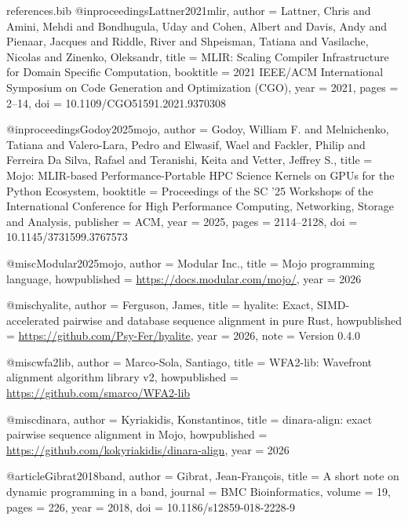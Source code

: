 \begin{filecontents*}[overwrite]{references.bib}
@inproceedings{Lattner2021mlir,
  author    = {Lattner, Chris and Amini, Mehdi and Bondhugula, Uday and Cohen, Albert and Davis, Andy and
               Pienaar, Jacques and Riddle, River and Shpeisman, Tatiana and Vasilache, Nicolas and
               Zinenko, Oleksandr},
  title     = {{MLIR}: Scaling Compiler Infrastructure for Domain Specific Computation},
  booktitle = {2021 IEEE/ACM International Symposium on Code Generation and Optimization (CGO)},
  year      = {2021},
  pages     = {2--14},
  doi       = {10.1109/CGO51591.2021.9370308}
}

@inproceedings{Godoy2025mojo,
  author    = {Godoy, William F. and Melnichenko, Tatiana and Valero-Lara, Pedro and Elwasif, Wael and
               Fackler, Philip and Ferreira Da Silva, Rafael and Teranishi, Keita and Vetter, Jeffrey S.},
  title     = {Mojo: {MLIR}-based Performance-Portable {HPC} Science Kernels on {GPUs} for the {Python} Ecosystem},
  booktitle = {Proceedings of the SC '25 Workshops of the International Conference for High Performance
               Computing, Networking, Storage and Analysis},
  publisher = {ACM},
  year      = {2025},
  pages     = {2114--2128},
  doi       = {10.1145/3731599.3767573}
}

@misc{Modular2025mojo,
  author       = {{Modular Inc.}},
  title        = {Mojo programming language},
  howpublished = {\url{https://docs.modular.com/mojo/}},
  year         = {2026}
}

@misc{hyalite,
  author       = {Ferguson, James},
  title        = {hyalite: Exact, {SIMD}-accelerated pairwise and database sequence alignment in pure {Rust}},
  howpublished = {\url{https://github.com/Psy-Fer/hyalite}},
  year         = {2026},
  note         = {Version 0.4.0}
}

@misc{wfa2lib,
  author       = {Marco-Sola, Santiago},
  title        = {{WFA2-lib}: Wavefront alignment algorithm library v2},
  howpublished = {\url{https://github.com/smarco/WFA2-lib}}
}

@misc{dinara,
  author       = {Kyriakidis, Konstantinos},
  title        = {dinara-align: exact pairwise sequence alignment in {Mojo}},
  howpublished = {\url{https://github.com/kokyriakidis/dinara-align}},
  year         = {2026}
}

@article{Gibrat2018band,
  author  = {Gibrat, Jean-Fran{\c{c}}ois},
  title   = {A short note on dynamic programming in a band},
  journal = {BMC Bioinformatics},
  volume  = {19},
  pages   = {226},
  year    = {2018},
  doi     = {10.1186/s12859-018-2228-9}
}


\end{filecontents*}
